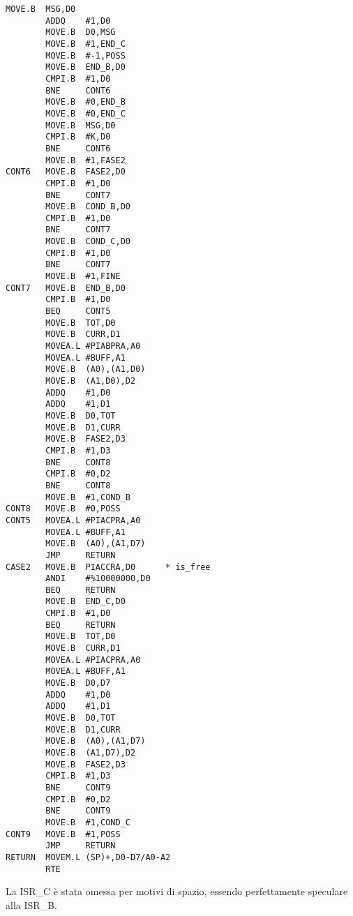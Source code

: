 \documentclass{article}
\begin{document}
\begin{lstlisting}[language=RISCAsm]
        MOVE.B  MSG,D0 
        ADDQ    #1,D0  
        MOVE.B  D0,MSG 
        MOVE.B	#1,END_C 
        MOVE.B  #-1,POSS 
        MOVE.B  END_B,D0 
        CMPI.B  #1,D0 
        BNE     CONT6
        MOVE.B  #0,END_B
        MOVE.B  #0,END_C 
        MOVE.B  MSG,D0 
        CMPI.B  #K,D0
        BNE     CONT6
        MOVE.B  #1,FASE2 
CONT6   MOVE.B  FASE2,D0 
        CMPI.B  #1,D0 
        BNE     CONT7
        MOVE.B  COND_B,D0 
        CMPI.B  #1,D0 
        BNE     CONT7 
        MOVE.B  COND_C,D0 
        CMPI.B  #1,D0 
        BNE     CONT7 
        MOVE.B  #1,FINE 
CONT7   MOVE.B  END_B,D0 
        CMPI.B  #1,D0 
        BEQ     CONT5 
        MOVE.B  TOT,D0 
        MOVE.B  CURR,D1 
        MOVEA.L #PIABPRA,A0
        MOVEA.L #BUFF,A1 
        MOVE.B  (A0),(A1,D0)
        MOVE.B  (A1,D0),D2
        ADDQ    #1,D0 
        ADDQ    #1,D1 
        MOVE.B  D0,TOT 
        MOVE.B  D1,CURR 
        MOVE.B  FASE2,D3 
        CMPI.B  #1,D3
        BNE     CONT8 
        CMPI.B  #0,D2 
        BNE     CONT8 
        MOVE.B  #1,COND_B 
CONT8   MOVE.B  #0,POSS 
CONT5   MOVEA.L #PIACPRA,A0 
        MOVEA.L #BUFF,A1 
        MOVE.B  (A0),(A1,D7)
        JMP     RETURN 
CASE2   MOVE.B  PIACCRA,D0      * is_free 
        ANDI    #%10000000,D0   
        BEQ     RETURN 
        MOVE.B  END_C,D0 
        CMPI.B  #1,D0 
        BEQ     RETURN 
        MOVE.B  TOT,D0 
        MOVE.B  CURR,D1 
        MOVEA.L #PIACPRA,A0
        MOVEA.L #BUFF,A1 
        MOVE.B  D0,D7 
        ADDQ    #1,D0 
        ADDQ    #1,D1 
        MOVE.B  D0,TOT 
        MOVE.B  D1,CURR 
        MOVE.B  (A0),(A1,D7)
        MOVE.B  (A1,D7),D2 
        MOVE.B  FASE2,D3 
        CMPI.B  #1,D3 
        BNE     CONT9
        CMPI.B  #0,D2 
        BNE     CONT9
        MOVE.B  #1,COND_C
CONT9   MOVE.B  #1,POSS 
        JMP     RETURN 
RETURN  MOVEM.L (SP)+,D0-D7/A0-A2
        RTE 
\end{lstlisting}
\vspace{1\baselineskip}
La ISR\_C è stata omessa per motivi di spazio, essendo perfettamente speculare alla ISR\_B. 
\end{document}

